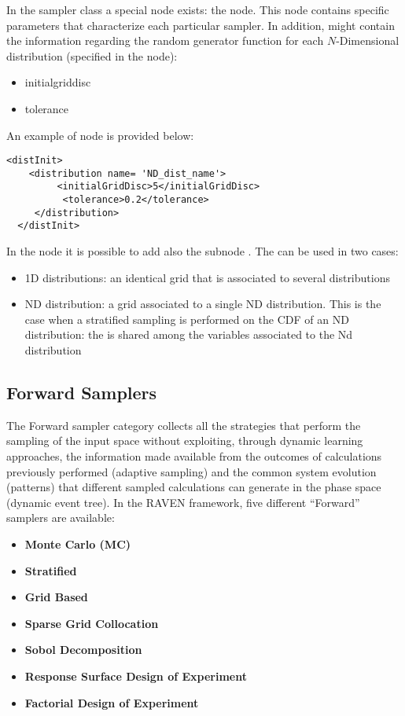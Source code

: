 In the sampler class a special node exists: the  node.
This node contains specific parameters that characterize each particular sampler.
In addition,  might contain the information regarding the random generator function for each $N$-Dimensional distribution (specified in the  node):
\begin{itemize}
\item initial\textunderscore grid\textunderscore disc
\item tolerance
\end{itemize}

An example of  node is provided below:

\begin{lstlisting}[style=XML]
<distInit>
    <distribution name= 'ND_dist_name'>
         <initialGridDisc>5</initialGridDisc>
          <tolerance>0.2</tolerance>
     </distribution>
  </distInit>
\end{lstlisting}

In the   node it is possible to add also the subnode .
The  can be used in two cases:
\begin{itemize}
\item 1D distributions: an identical grid that is associated to several distributions
\item ND distribution: a grid associated to a single ND distribution. This is the case when a stratified sampling is performed on the CDF of an ND distribution: the   is  shared among the variables associated to the Nd distribution
\end{itemize}

\subsection{Forward Samplers}
\label{subsec:onceThroughSamplers}
The Forward sampler category collects all the strategies that perform the
sampling of the input space without exploiting, through dynamic learning
approaches, the information made available from the outcomes of calculations
previously performed (adaptive sampling) and the common system evolution
(patterns) that different sampled calculations can generate in the phase space
(dynamic event tree).
%
In the RAVEN framework, five different “Forward” samplers
are available:
\begin{itemize}
\item \textbf{Monte Carlo (MC)}
\item \textbf{Stratified}
\item \textbf{Grid Based}
\item \textbf{Sparse Grid Collocation}
\item \textbf{Sobol Decomposition}
\item \textbf{Response Surface Design of Experiment}
\item \textbf{Factorial Design of Experiment}
\end{itemize}


